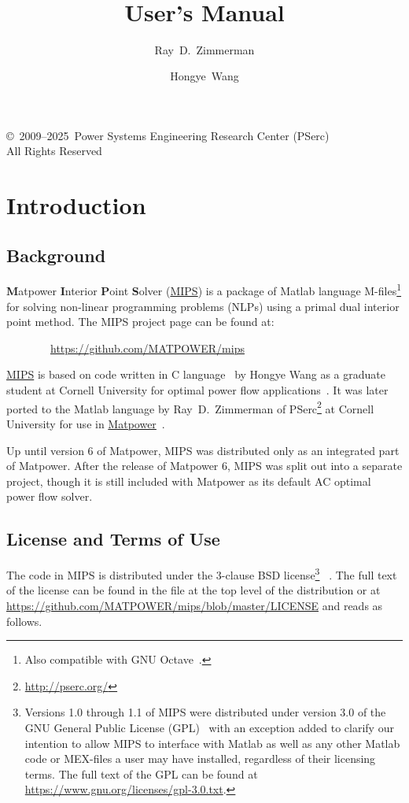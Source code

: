 \documentclass[12pt]{article}
\title{\mipsname{}\\\mips{} \mipsver{}\\
User's Manual}
\author{Ray~D.~Zimmerman \and Hongye~Wang}
\newcommand{\matlab}[0]{{\sc Matlab}}
\newcommand{\matpower}[0]{{\sc Matpower}}
\newcommand{\matpowerurl}[0]{https://matpower.org}
\newcommand{\matpowerlink}[0]{\href{\matpowerurl}{\matpower{}}}
\newcommand{\mips}[0]{{MIPS}}
\newcommand{\mipsurl}[0]{https://github.com/MATPOWER/mips}
\newcommand{\mipslink}[0]{\href{\mipsurl}{\mips{}}}
\newcommand{\mipsname}[0]{{{\bf M}{\sc atpower} \textbf{I}nterior \textbf{P}oint \textbf{S}olver}}
\newcommand{\pserc}[0]{{\sc PSerc}}
\newcommand{\PSERC}[0]{{Power Systems Engineering Research Center (\pserc{})}}
\newcommand{\code}[1]{{\relsize{-0.5}{\tt{{#1}}}}}  %
\numberwithin{equation}{section}
\numberwithin{table}{section}
\numberwithin{figure}{section}
\begin{document}
\maketitle
\thispagestyle{empty}
\vfill
\begin{center}
{\scriptsize
\copyright~2009--2025~\PSERC{}\\
All Rights Reserved}
\end{center}

\clearpage
\tableofcontents
\clearpage
\listoftables

\clearpage
\section{Introduction}

\subsection{Background}

\mipsname{} (\mipslink{}) is a package of \matlab{} language M-files\footnote{Also compatible with GNU Octave~\cite{octave}.} for solving non-linear programming problems (NLPs) using a primal dual interior point method. The \mips{} project page can be found at:

\bigskip

~~~~~~~~\url{\mipsurl}

\bigskip

\mipslink{} is based on code written in C language~\cite{tspopf} by Hongye Wang as a graduate student at Cornell University for optimal power flow applications~\cite{wang2007a,wang2007}. It was later ported to the \matlab{} language by Ray~D.~Zimmerman of \pserc{}\footnote{\url{http://pserc.org/}} at Cornell University for use in \matpowerlink{}~\cite{zimmerman2011,matpower}.

Up until version 6 of \matpower{}, \mips{} was distributed only as an integrated part of \matpower{}. After the release of \matpower{} 6, \mips{} was split out into a separate project, though it is still included with \matpower{} as its default AC optimal power flow solver.


\clearpage
\subsection{License and Terms of Use}

The code in \mips{} is distributed under the 3-clause BSD license\footnote{Versions 1.0 through 1.1 of \mips{} were distributed under version 3.0 of the GNU General Public License (GPL)~\cite{gpl} with an exception added to clarify our intention to allow \mips{} to interface with \matlab{} as well as any other \matlab{} code or MEX-files a user may have installed, regardless of their licensing terms. The full text of the GPL can be found at \url{https://www.gnu.org/licenses/gpl-3.0.txt}.}
~\cite{bsd}. The full text of the license can be found in the \code{LICENSE} file at the top level of the distribution or at \url{https://github.com/MATPOWER/mips/blob/master/LICENSE} and reads as follows.
\end{document}
